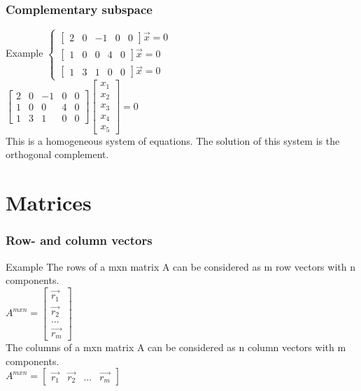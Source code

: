 \begin{frame}
	\frametitle{Complementary subspace}
	\begin{block}{Example}
		$\begin{cases}
		\begin{bmatrix} 2 & 0 & -1 & 0 & 0 \end{bmatrix} \overrightarrow{x}=0\\
		\begin{bmatrix} 1 & 0 & 0 & 4 & 0 \end{bmatrix} \overrightarrow{x}=0\\
		\begin{bmatrix} 1 & 3 & 1 & 0 & 0 \end{bmatrix} \overrightarrow{x}=0
		\end{cases}$\\
		$\begin{bmatrix} 
		2 & 0 & -1 & 0 & 0\\
		1 & 0 & 0 & 4 & 0\\
		1 & 3 & 1 & 0 & 0
		\end{bmatrix} 
		\begin{bmatrix}
		x_1\\ x_2\\ x_3\\ x_4\\ x_5
		\end{bmatrix}=0$\\
		This is a homogeneous system of equations. The solution of this system is the orthogonal complement. 	
	\end{block}
\end{frame}


\section{Matrices}

\begin{frame}
	\frametitle{Row- and column vectors}
	\begin{block}{Example}
		The rows of a mxn matrix A can be considered as m row vectors with n components.\\
		$A^{mxn}=\begin{bmatrix} \overrightarrow{r_1}\\ \overrightarrow{r_2}\\ ...\\\overrightarrow{r_m}\end{bmatrix}$\\
		The columns of a mxn matrix A can be considered as n column vectors with m components.\\
		$A^{mxn}=\begin{bmatrix} \overrightarrow{r_1}& \overrightarrow{r_2}& ...& \overrightarrow{r_m}\end{bmatrix}$
	\end{block}
\end{frame}

